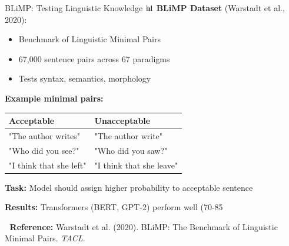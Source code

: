 \documentclass[aspectratio=169]{beamer}
\begin{document}
\begin{frame}{BLiMP: Testing Linguistic Knowledge 📊}
    \textbf{BLiMP Dataset} (Warstadt et al., 2020):
    \begin{itemize}\setlength{\itemsep}{0pt}
        \item Benchmark of Linguistic Minimal Pairs
        \item 67,000 sentence pairs across 67 paradigms
        \item Tests syntax, semantics, morphology
    \end{itemize}

    \vspace{0.5em}
    \textbf{Example minimal pairs:}

    \begin{center}
        \begin{tabular}{ll}
            \toprule
            \textbf{Acceptable} & \textbf{Unacceptable} \\
            \midrule
            "The author writes" & "The author write" \\
            "Who did you see?" & "Who did you saw?" \\
            "I think that she left" & "I think that she leave" \\
            \bottomrule
        \end{tabular}
    \end{center}

    \vspace{0.5em}
    \textbf{Task:} Model should assign higher probability to acceptable sentence

    \vspace{0.5em}
    \textbf{Results:} Transformers (BERT, GPT-2) perform well (70-85%

    \vspace{0.3em}
    📖 \textbf{Reference:} Warstadt et al. (2020). BLiMP: The Benchmark of Linguistic Minimal Pairs. \textit{TACL}.
\end{frame}
\end{document}

